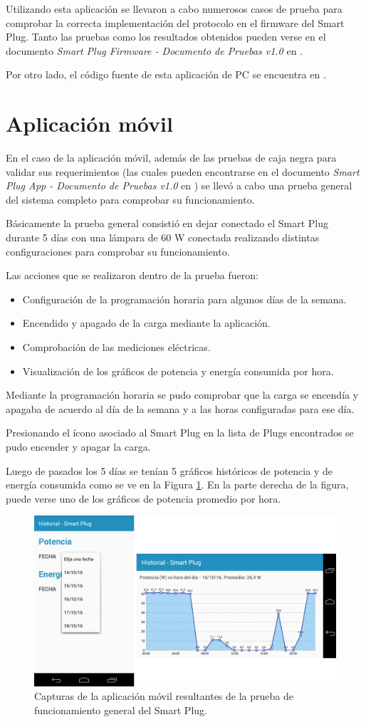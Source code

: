 Utilizando esta aplicación se llevaron a cabo numerosos casos de prueba para comprobar la correcta implementación del protocolo en el firmware del Smart Plug. Tanto las pruebas como los resultados obtenidos pueden verse en el documento \textit{Smart Plug Firmware - Documento de Pruebas v1.0} en \citep{repo_docu_firmware}.

Por otro lado, el código fuente de esta aplicación de PC se encuentra en \citep{repo_simulador_tcp}.


\section{Aplicación móvil}

En el caso de la aplicación móvil, además de las pruebas de caja negra para validar sus requerimientos (las cuales pueden encontrarse en el documento \textit{Smart Plug App - Documento de Pruebas v1.0} en \citep{repo_docu_app}) se llevó a cabo una prueba general del sistema completo para comprobar su funcionamiento.

Básicamente la prueba general consistió en dejar conectado el Smart Plug durante 5 días con una lámpara de 60 W conectada realizando distintas configuraciones para comprobar su funcionamiento.

Las acciones que se realizaron dentro de la prueba fueron:

\begin{itemize}
\item Configuración de la programación horaria para algunos días de la semana.
\item Encendido y apagado de la carga mediante la aplicación.
\item Comprobación de las mediciones eléctricas.
\item Visualización de los gráficos de potencia y energía consumida por hora.
\end{itemize}

Mediante la programación horaria se pudo comprobar que la carga se encendía y apagaba de acuerdo al día de la semana y a las horas configuradas para ese día.

Presionando el ícono asociado al Smart Plug en la lista de Plugs encontrados se pudo encender y apagar la carga.

Luego de pasados los 5 días se tenían 5 gráficos históricos de potencia y de energía consumida como se ve en la Figura \ref{fig:integracion}. En la parte derecha de la figura, puede verse uno de los gráficos de potencia promedio por hora.


\begin{figure}[h]
	\centering
	\includegraphics[width=12cm]{./Figures/4_1_3_integracion.png}
	\caption{Capturas de la aplicación móvil resultantes de la prueba de funcionamiento general del Smart Plug.}
	\label{fig:integracion}
\end{figure}